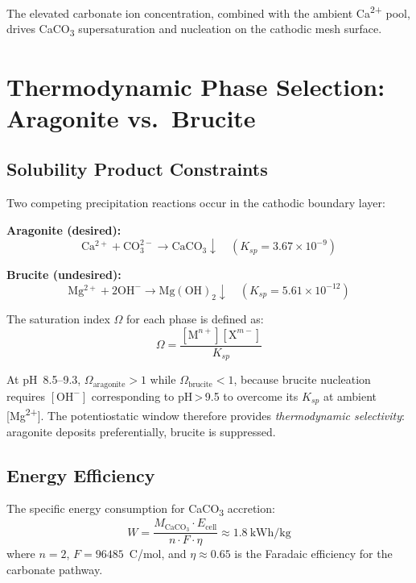 \documentclass[journal,twocolumn]{IEEEtran}
\begin{document}
The elevated carbonate ion concentration, combined with the ambient Ca\textsuperscript{2+} pool, drives CaCO\textsubscript{3} supersaturation and nucleation on the cathodic mesh surface.

\section{Thermodynamic Phase Selection: Aragonite vs.\ Brucite}

\subsection{Solubility Product Constraints}

Two competing precipitation reactions occur in the cathodic boundary layer:

\textbf{Aragonite (desired):}
\begin{equation}
  \mathrm{Ca^{2+} + CO_3^{2-} \rightarrow CaCO_3\downarrow} \quad (K_{sp} = 3.67 \times 10^{-9})
  \label{eq:arag}
\end{equation}

\textbf{Brucite (undesired):}
\begin{equation}
  \mathrm{Mg^{2+} + 2OH^- \rightarrow Mg(OH)_2\downarrow} \quad (K_{sp} = 5.61 \times 10^{-12})
  \label{eq:bru}
\end{equation}

The saturation index $\Omega$ for each phase is defined as:
\begin{equation}
  \Omega = \frac{[\mathrm{M}^{n+}][\mathrm{X}^{m-}]}{K_{sp}}
  \label{eq:omega}
\end{equation}

At pH~8.5--9.3, $\Omega_{\mathrm{aragonite}} > 1$ while $\Omega_{\mathrm{brucite}} < 1$, because brucite nucleation requires $[\mathrm{OH}^-]$ corresponding to pH\,>\,9.5 to overcome its $K_{sp}$ at ambient [Mg\textsuperscript{2+}]. The potentiostatic window therefore provides \textit{thermodynamic selectivity}: aragonite deposits preferentially, brucite is suppressed.

\subsection{Energy Efficiency}

The specific energy consumption for CaCO\textsubscript{3} accretion:
\begin{equation}
  W = \frac{M_{\mathrm{CaCO_3}} \cdot E_{\mathrm{cell}}}{n \cdot F \cdot \eta} \approx 1.8~\mathrm{kWh/kg}
  \label{eq:energy}
\end{equation}
where $n=2$, $F=96485$~C/mol, and $\eta \approx 0.65$ is the Faradaic efficiency for the carbonate pathway.
\end{document}
